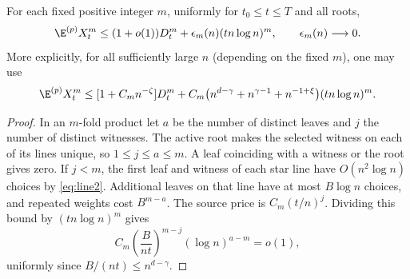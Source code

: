 \begin{lemma}\label{lem:short}
For each fixed positive integer \(m\), uniformly for \(t_0\le t\le T\)
and all roots,
\begin{equation}\label{eq:shortmoment}
 \E^{(p)}X_t^m\le(1+o(1))D_t^m+\epsilon_m(n)(tn\log n)^m,
 \qquad \epsilon_m(n)\longrightarrow0.
\end{equation}
More explicitly, for all sufficiently large \(n\) (depending on
the fixed \(m\)), one may use
\begin{equation}\label{eq:shortexplicit}
 \E^{(p)}X_t^m\le[1+C_m n^{-\zeta}]D_t^m+
 C_m\bigl(n^{d-\gamma}+n^{\gamma-1}+n^{-1+\xi}\bigr)
                (tn\log n)^m.
\end{equation}
\end{lemma}
\begin{proof}
In an \(m\)-fold product let \(a\) be the number of distinct leaves
and \(j\) the number of distinct witnesses. The active root makes
the selected witness on each of its lines unique, so
\(1\le j\le a\le m\). A leaf coinciding with a witness or the root
gives zero. If \(j<m\), the first leaf and witness of each star
line have \(O(n^2\log n)\) choices by \eqref{eq:line2}.
Additional leaves on that line have at most \(B\log n\) choices,
and repeated weights cost \(B^{m-a}\). The source price is
\(C_m(t/n)^j\). Dividing this bound by \((tn\log n)^m\) gives
\[
 C_m\left(\frac B{nt}\right)^{m-j}(\log n)^{a-m}=o(1),
\]
uniformly since \(B/(nt)\le n^{d-\gamma}\).


\end{proof}
